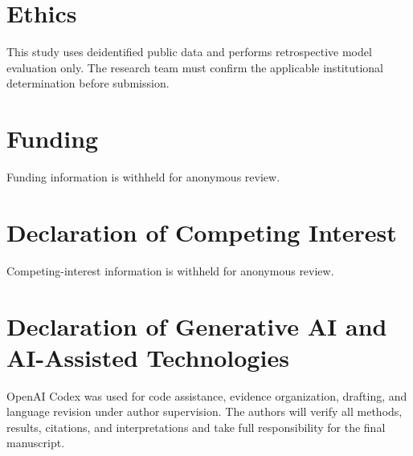 \documentclass[conference]{IEEEtran}
\begin{document}
\section{Ethics}\label{ethics}

This study uses deidentified public data and performs retrospective model
evaluation only. The research team must confirm the applicable institutional
determination before submission.

\section{Funding}\label{funding}

Funding information is withheld for anonymous review.

\section{Declaration of Competing Interest}\label{declaration-of-competing-interest}

Competing-interest information is withheld for anonymous review.

\section{Declaration of Generative AI and AI-Assisted Technologies}\label{declaration-of-generative-ai-and-ai-assisted-technologies}

OpenAI Codex was used for code assistance, evidence organization, drafting, and
language revision under author supervision. The authors will verify all
methods, results, citations, and interpretations and take full responsibility
for the final manuscript.
\end{document}
